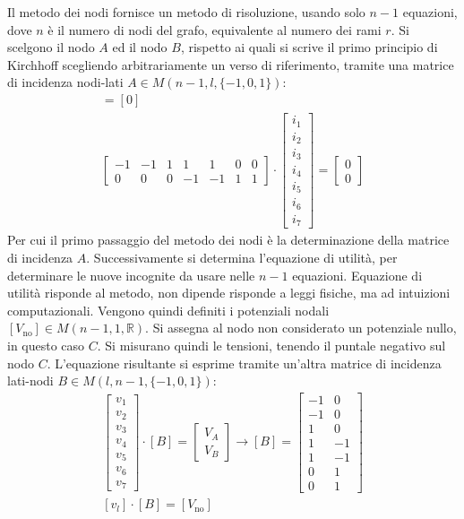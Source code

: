 \documentclass{article}
\numberwithin{equation}{subsection}
\begin{document}
Il metodo dei nodi fornisce un metodo di risoluzione, usando solo $n-1$ equazioni, dove $n$ è il numero di nodi del grafo, equivalente al numero dei rami $r$. 
Si scelgono il nodo $A$ ed il nodo $B$, rispetto ai quali si scrive il primo principio di Kirchhoff scegliendo arbitrariamente un verso di riferimento, tramite una matrice di 
incidenza nodi-lati $A\in M(n-1,l,\{-1,0,1\})$:
\begin{gather*}
    [A][i_l]=[0]\\
    \begin{bmatrix}
        -1&-1&1&1&1&0&0\\
        0&0&0&-1&-1&1&1
    \end{bmatrix}\cdot\begin{bmatrix}
        i_1\\
        i_2\\
        i_3\\
        i_4\\
        i_5\\
        i_6\\
        i_7
    \end{bmatrix}=\begin{bmatrix}
        0\\
        0
    \end{bmatrix}
\end{gather*}
Per cui il primo passaggio del metodo dei nodi è la determinazione della matrice di incidenza $A$. Successivamente si determina l'equazione di utilità, per determinare le nuove 
incognite da usare nelle $n-1$ equazioni. Equazione di utilità risponde al metodo, non dipende risponde a leggi fisiche, ma ad intuizioni computazionali. 
Vengono quindi definiti i potenziali nodali $[V_\mathrm{no}]\in M(n-1,1,\mathbb{R})$. Si assegna al nodo non considerato un potenziale nullo, in questo caso $C$. 
Si misurano quindi le tensioni, tenendo il puntale negativo sul nodo $C$. L'equazione risultante si esprime tramite un'altra matrice di incidenza lati-nodi $B\in M(l,n-1,\{-1,0,1\})$: 
\begin{gather*}
    \begin{bmatrix}
        v_1\\
        v_2\\
        v_3\\
        v_4\\
        v_5\\
        v_6\\
        v_7
    \end{bmatrix}\cdot[B]=\begin{bmatrix}
        V_A\\
        V_B
    \end{bmatrix}\to[B]=\begin{bmatrix}
        -1&0\\
        -1&0\\
        1&0\\
        1&-1\\
        1&-1\\
        0&1\\
        0&1
    \end{bmatrix}\\
    [v_l]\cdot[B]=[V_\mathrm{no}]
\end{gather*}
\end{document}

